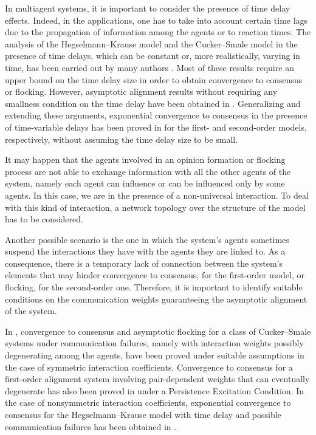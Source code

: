 \documentclass[11pt]{article}
\begin{document}
In multiagent systems, it is important to consider the presence of time delay
effects. Indeed, in the applications, one has to take into account certain time
lags due to the propagation of information among the agents or to reaction
times. The analysis of the Hegselmann--Krause model and the Cucker--Smale model
in the presence of time delays, which can be constant or, more realistically,
varying in time, has been carried out by many authors
\cite{CH,CL,CPP, DH, DHY,
	H, H3, HM, HaskCartabia, LW, Lu,P, PR,PT}.
Most of these results require an upper bound on the time delay size in order
to obtain convergence to consensus or flocking. However, asymptotic alignment
results without requiring any smallness condition on the time delay have been
obtained in \cite{H,Cartabia}. Generalizing and extending these
arguments, exponential convergence to consensus in the presence of
time-variable delays has been proved in
\cite{ContPi,Cont} for the first- and second-order
models, respectively, without assuming the time delay size to be small. 

It may happen that the agents involved in an opinion formation or flocking
process are not able to exchange information with all the other agents of the
system, namely each agent can influence or can be influenced only by some
agents. In this case, we are in the presence of a non-universal interaction.
To deal with this kind of interaction, a network topology over the structure
of the model has to be considered.

Another possible scenario is the one in which the system's agents sometimes
suspend the interactions they have with the agents they are linked to. As a
consequence, there is a temporary lack of connection between the system's
elements that may hinder convergence to consensus, for the first-order model,
or flocking, for the second-order one. Therefore, it is important to identify
suitable conditions on the communication weights guaranteeing the asymptotic
alignment of the system.

In \cite{Bonnet}, convergence to consensus and asymptotic flocking for a
class of Cucker--Smale systems under communication failures, namely with
interaction weights possibly degenerating among the agents, have been proved
under suitable assumptions in the case of symmetric interaction coefficients.
Convergence to consensus for a first-order alignment system involving
pair-dependent weights that can eventually degenerate has also been proved in
\cite{AnconaRossi} under a Persistence Excitation Condition. In the case of
nonsymmetric interaction coefficients, exponential convergence to consensus
for the Hegselmann--Krause model with time delay and possible communication
failures has been obtained in \cite{ContPi}. 
\end{document}
